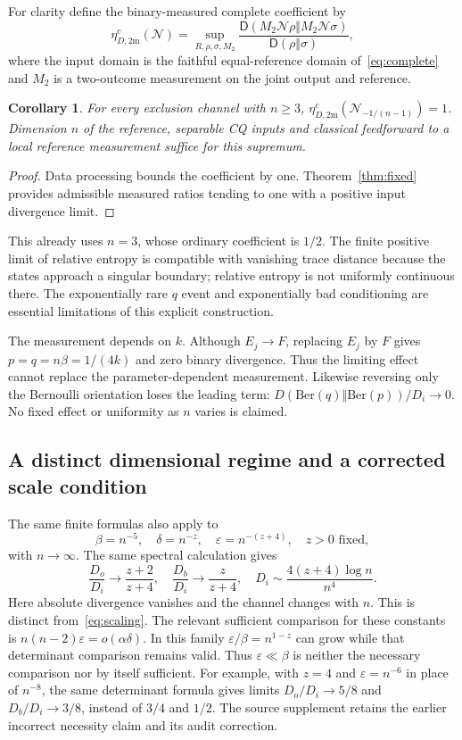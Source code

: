 \documentclass[11pt]{article}
\newtheorem{corollary}[theorem]{Corollary}
\theoremstyle{remark}\newtheorem{remark}[theorem]{Remark}
\newcommand{\D}{\mathsf D}
\newcommand{\N}{\mathcal N}
\newcommand{\eps}{\varepsilon}
\begin{document}
For clarity define the binary-measured complete coefficient by
\[
 \eta_{D,2\mathrm m}^c(\N)=
 \sup_{R,\rho,\sigma,M_2}
 \frac{\D(M_2\N\rho\Vert M_2\N\sigma)}{\D(\rho\Vert\sigma)},
\]
where the input domain is the faithful equal-reference domain of~\eqref{eq:complete} and $M_2$ is a two-outcome measurement on the joint output and reference.
\begin{corollary}
For every exclusion channel with $n\geq3$, $\eta_{D,2\mathrm m}^c(\N_{-1/(n-1)})=1$. Dimension $n$ of the reference, separable CQ inputs and classical feedforward to a local reference measurement suffice for this supremum.
\end{corollary}
\begin{proof}
Data processing bounds the coefficient by one. Theorem~\ref{thm:fixed} provides admissible measured ratios tending to one with a positive input divergence limit.
\end{proof}
This already uses $n=3$, whose ordinary coefficient is $1/2$. The finite positive limit of relative entropy is compatible with vanishing trace distance because the states approach a singular boundary; relative entropy is not uniformly continuous there. The exponentially rare $q$ event and exponentially bad conditioning are essential limitations of this explicit construction.

The measurement depends on $k$. Although $E_j\to F$, replacing $E_j$ by $F$ gives $p=q=n\beta=1/(4k)$ and zero binary divergence. Thus the limiting effect cannot replace the parameter-dependent measurement. Likewise reversing only the Bernoulli orientation loses the leading term: $D(\mathrm{Ber}(q)\Vert\mathrm{Ber}(p))/D_i\to0$. No fixed effect or uniformity as $n$ varies is claimed.

\subsection{A distinct dimensional regime and a corrected scale condition}
The same finite formulas also apply to
\[
 \beta=n^{-5},\quad\delta=n^{-z},\quad\eps=n^{-(z+4)},\quad z>0\text{ fixed},
\]
with $n\to\infty$. The same spectral calculation gives
\[
 \frac{D_o}{D_i}\to\frac{z+2}{z+4},\quad
 \frac{D_b}{D_i}\to\frac{z}{z+4},\quad
 D_i\sim\frac{4(z+4)\log n}{n^4}.
\]
Here absolute divergence vanishes and the channel changes with $n$. This is distinct from~\eqref{eq:scaling}. The relevant sufficient comparison for these constants is $n(n-2)\eps=o(\alpha\delta)$. In this family $\eps/\beta=n^{1-z}$ can grow while that determinant comparison remains valid. Thus $\eps\ll\beta$ is neither the necessary comparison nor by itself sufficient. For example, with $z=4$ and $\eps=n^{-6}$ in place of $n^{-8}$, the same determinant formula gives limits $D_o/D_i\to5/8$ and $D_b/D_i\to3/8$, instead of $3/4$ and $1/2$. The source supplement retains the earlier incorrect necessity claim and its audit correction.
\end{document}
